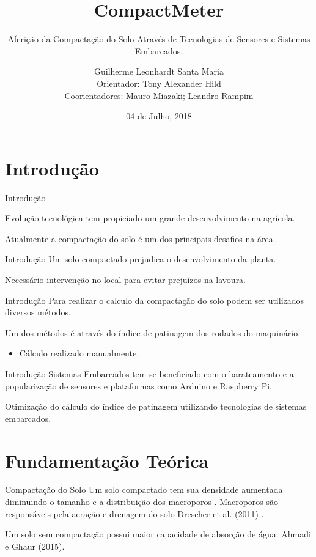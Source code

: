 \documentclass[12pt]{beamer}
\title{CompactMeter}
\subtitle{Aferição da Compactação do Solo Através de Tecnologias de Sensores e Sistemas Embarcados.}
\date{04 de Julho, 2018}
\author{Guilherme Leonhardt Santa Maria \\ Orientador: Tony Alexander Hild \\ Coorientadores: Mauro Miazaki; Leandro Rampim}
\institute{Universidade Estadual do Centro-Oeste}
\begin{document}
\maketitle

\section{Introdução}

\begin{frame}[fragile]{Introdução}

  Evolução tecnológica tem propiciado um grande desenvolvimento na agrícola.
  
  Atualmente a compactação do solo é um dos principais desafios na área.
\end{frame}

\begin{frame}{Introdução}
    Um solo compactado prejudica o desenvolvimento da planta.
    
    Necessário intervenção no local para evitar prejuízos na lavoura.
\end{frame}

\begin{frame}{Introdução}
    Para realizar o calculo da compactação do solo podem ser utilizados diversos métodos.
    
    Um dos métodos é através do índice de patinagem dos rodados do maquinário.
    \begin{itemize}
        \item Cálculo realizado manualmente.
    \end{itemize}
\end{frame}

\begin{frame}{Introdução}
    Sistemas Embarcados tem se beneficiado com o barateamento e a popularização de sensores e plataformas como Arduino e Raspberry Pi.
    
    Otimização do cálculo do índice de patinagem utilizando tecnologias de sistemas embarcados.
\end{frame}

\section{Fundamentação Teórica}
\begin{frame}{Compactação do Solo }
    Um solo compactado tem sua densidade aumentada diminuindo o tamanho e a distribuição dos macroporos \nocite{drescher2011persistencia}.
    \vspace{0.2cm}
    Macroporos são responsáveis pela aeração e drenagem do solo 
    Drescher et al. (2011) \nocite{drescher2011persistencia}.
    \vspace{0.2cm}
    
    Um solo sem compactação possui maior capacidade de absorção de água. Ahmadi e Ghaur (2015). \nocite{ahmadi2015effects}
    
\end{frame}
\end{document}
